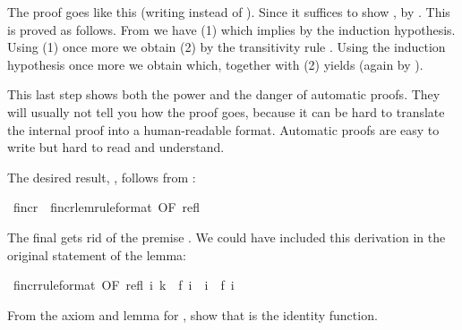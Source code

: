\begin{isabellebody}
\begin{isamarkuptext}
\begin{isabelle}
\isanewline
{}
\end{isabelle}
%
The proof goes like this (writing  instead of ).
Since  it suffices to show
\hbox{},
by \@.  This is
proved as follows. From  we have 
(1) which implies  by the induction hypothesis.
Using (1) once more we obtain  (2) by the transitivity
rule .
Using the induction hypothesis once more we obtain 
which, together with (2) yields  (again by
).

This last step shows both the power and the danger of automatic proofs.  They
will usually not tell you how the proof goes, because it can be hard to
translate the internal proof into a human-readable format.  Automatic
proofs are easy to write but hard to read and understand.

The desired result, , follows from :%
\end{isamarkuptext}%
\isamarkuptrue%
\isamarkupfalse%
\ f{\isacharunderscore}incr\ {\isacharequal}\ f{\isacharunderscore}incr{\isacharunderscore}lem{\isacharbrackleft}rule{\isacharunderscore}format{\isacharcomma}\ OF\ refl{\isacharbrackright}%
\begin{isamarkuptext}%
\noindent
The final  gets rid of the premise . 
We could have included this derivation in the original statement of the lemma:%
\end{isamarkuptext}%
\isamarkuptrue%
\isamarkupfalse%
\ f{\isacharunderscore}incr{\isacharbrackleft}rule{\isacharunderscore}format{\isacharcomma}\ OF\ refl{\isacharbrackright}{\isacharcolon}\ {\isachardoublequoteopen}{\isasymforall}i{\isachardot}\ k\ {\isacharequal}\ f\ i\ {\isasymlongrightarrow}\ i\ {\isasymle}\ f\ i{\isachardoublequoteclose}%
\isadelimproof
%
\endisadelimproof
%
\isatagproof
%
\endisatagproof
{\isafoldproof}%
%
\isadelimproof
%
\endisadelimproof
%
\begin{isamarkuptext}%
\begin{exercise}
From the axiom and lemma for , show that  is the
identity function.
\end{exercise}


\end{isamarkuptext}
\end{isabellebody}
